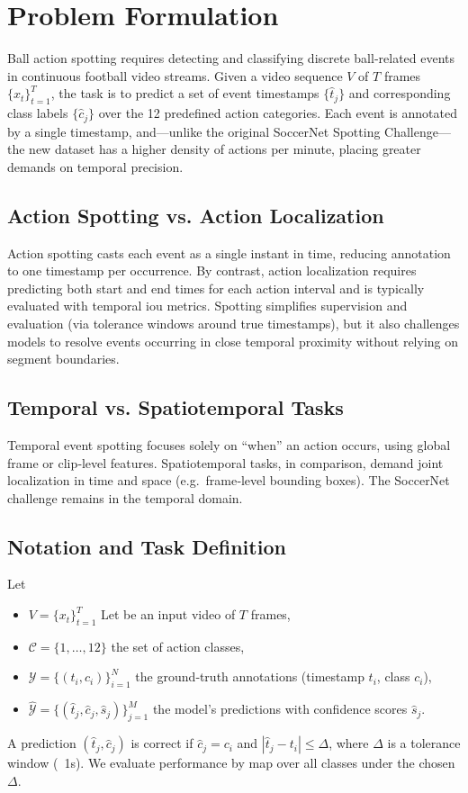 \section{Problem Formulation}
\label{sec:problem_formulation}
Ball action spotting requires detecting and classifying discrete ball‐related events in continuous football video streams. Given a video sequence \(V\) of \(T\) frames \(\{x_t\}_{t=1}^T\), the task is to predict a set of event timestamps \(\{\hat t_j\}\) and corresponding class labels \(\{\hat c_j\}\) over the 12 predefined action categories. Each event is annotated by a single timestamp, and—unlike the original SoccerNet Spotting Challenge—the new dataset has a higher density of actions per minute, placing greater demands on temporal precision.

\subsection{Action Spotting vs. Action Localization}
Action spotting casts each event as a single instant in time, reducing annotation to one timestamp per occurrence. By contrast, action localization requires predicting both start and end times for each action interval and is typically evaluated with temporal \acrfull{iou} metrics. Spotting simplifies supervision and evaluation (via tolerance windows around true timestamps), but it also challenges models to resolve events occurring in close temporal proximity without relying on segment boundaries.

\subsection{Temporal vs. Spatiotemporal Tasks}
Temporal event spotting focuses solely on “when” an action occurs, using global frame or clip‐level features. Spatiotemporal tasks, in comparison, demand joint localization in time and space (e.g.\ frame‐level bounding boxes). The SoccerNet challenge remains in the temporal domain. 

\subsection{Notation and Task Definition}
Let
\begin{itemize}
    \item \(V = \{x_t\}_{t=1}^T\) Let be an input video of \(T\) frames,  
    \item \(\mathcal{C} = \{1,\dots,12\}\) the set of action classes,  
    \item \(\mathcal{Y} = \{(t_i,c_i)\}_{i=1}^N\) the ground‐truth annotations (timestamp \(t_i\), class \(c_i\)),  
    \item \(\hat{\mathcal{Y}} = \{(\hat t_j,\hat c_j,\hat s_j)\}_{j=1}^M\) the model’s predictions with confidence scores \(\hat s_j\).  
\end{itemize}
A prediction \((\hat t_j,\hat c_j)\) is correct if \(\hat c_j=c_i\) and \(|\hat t_j - t_i|\le\Delta\), where \(\Delta\) is a tolerance window (\ 1s). We evaluate performance by \acrfull{map} over all classes under the chosen \(\Delta\).  



